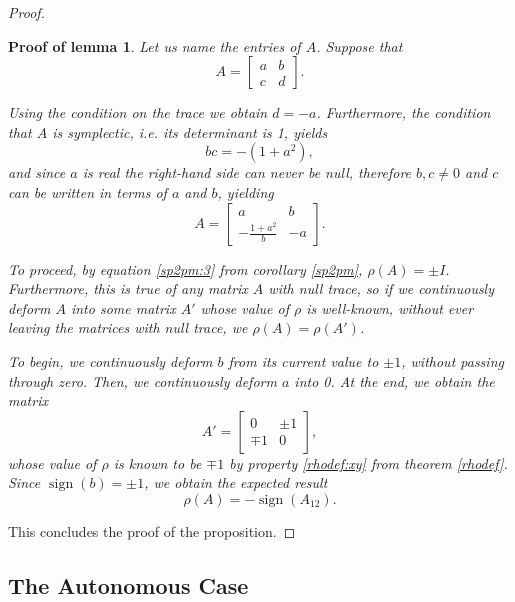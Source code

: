 \documentclass{article}
\theoremstyle{nonumberplain}
\newtheorem{proof}{Proof}
\newtheorem{lemmaproof}{Proof of lemma}
\DeclareMathOperator{\sign}{sign}
\begin{document}
\begin{proof}
\begin{lemmaproof}
Let us name the entries of $A$. Suppose that
\begin{equation}
A = \begin{bmatrix}
a & b\\
c & d
\end{bmatrix}.
\end{equation}

Using the condition on the trace we obtain $d = -a$. Furthermore, the condition that $A$ is symplectic, i.e. its determinant is 1, yields
\begin{equation}
bc = -(1 + a^2),
\end{equation}
and since $a$ is real the right-hand side can never be null, therefore $b, c \neq 0$ and $c$ can be written in terms of $a$ and $b$, yielding
\begin{equation}
A = \begin{bmatrix}
a & b\\
-\frac{1+a^2}b & -a
\end{bmatrix}.
\end{equation}

To proceed, by equation \eqref{sp2pm:3} from corollary \ref{sp2pm}, $\rho(A) = \pm I$. Furthermore, this is true of any matrix $A$ with null trace, so if we continuously deform $A$ into some matrix $A'$ whose value of $\rho$ is well-known, without ever leaving the matrices with null trace, we $\rho(A) = \rho(A')$.

To begin, we continuously deform $b$ from its current value to $\pm 1$, without passing through zero. Then, we continuously deform $a$ into 0. At the end, we obtain the matrix
\begin{equation}
A' = \begin{bmatrix}
0 & \pm 1\\
\mp 1 & 0
\end{bmatrix},
\end{equation}
whose value of $\rho$ is known to be $\mp 1$ by property \ref{rhodef:xy} from theorem \ref{rhodef}. Since $\sign(b) = \pm 1$, we obtain the expected result
\begin{equation}
\rho(A) = - \sign(A_{12}).
\end{equation}
\end{lemmaproof}

This concludes the proof of the proposition.
\end{proof}

\subsection{The Autonomous Case}
\end{document}

